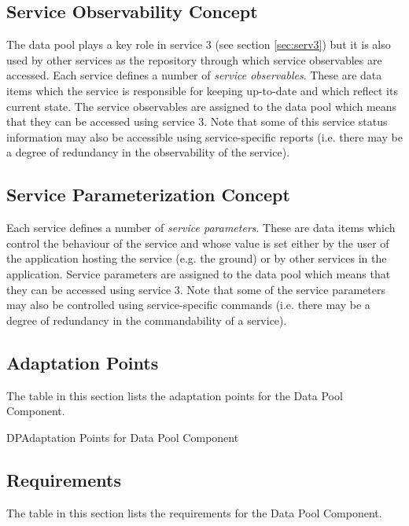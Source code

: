 \documentclass[a4paper,10pt]{article}
\newenvironment{cr_ap}[2]
{
\begin{longtable}{|l|p{4.7cm}|p{6.9cm}|}
\caption{#2}\label{tab:AP-#1} \\
\hline
\rowcolor{light-gray}
\textbf{AP ID} & \textbf{Adaptation Point} & \textbf{Close-Out Value}\\
\hline\hline
\endfirsthead
\rowcolor{light-gray}
\textbf{AP ID} & \textbf{Adaptation Point} & \textbf{Close-Out Value}\\
\hline\hline
\endhead
\DTLforeach*[\DTLiseq{\cat}{#1}]{dbAP}{\cat=Category,\origin=Origin,\id=Id,\ap=AP,\defValue=DefValue}
{\DTLiffirstrow{}{\\\hline}P-\cat-\id & \ap\ (\origin) & \defValue}\\\hline
}
{\end{longtable}}
\begin{document}
\subsection{Service Observability Concept}\label{sec:servObsConcept}
The data pool plays a key role in service 3 (see section \ref{sec:serv3}) but it is also used by other services as the repository through which service observables are accessed. Each service defines a number of \textit{service observables}. These are data items which the service is responsible for keeping up-to-date and which reflect its current state. The service observables are assigned to the data pool which means that they can be accessed using service 3. Note that some of this service status information may also be accessible using service-specific reports (i.e. there may be a degree of redundancy in the observability of the service). 

\subsection{Service Parameterization Concept}\label{sec:servParConcept}
Each service defines a number of \textit{service parameters}. These are data items which control the behaviour of the service and whose value is set either by the user of the application hosting the service (e.g. the ground) or by other services in the application. Service parameters are assigned to the data pool which means that they can be accessed using service 3. Note that some of the service parameters may also be controlled using service-specific commands (i.e. there may be a degree of redundancy in the commandability of a service).


\subsection{Adaptation Points}
The table in this section lists the adaptation points for the Data Pool Component.

\begin{cr_ap}{DP}{Adaptation Points for Data Pool Component}
\end{cr_ap}

\subsection{Requirements}
The table in this section lists the requirements for the Data Pool Component.
\end{document}
